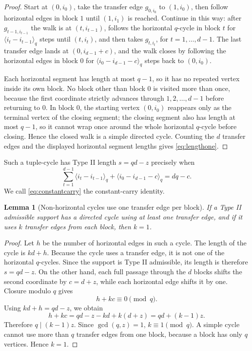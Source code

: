 \documentclass[11pt]{article}
\newtheorem{lemma}[theorem]{Lemma}
\theoremstyle{definition}
\theoremstyle{remark}
\begin{document}
\begin{proof}
Start at $(0,i_0)$, take the transfer edge $g_{0,i_0}$ to $(1,i_0)$, then follow horizontal edges in block $1$ until $(1,i_1)$ is reached.  Continue in this way: after $g_{t-1,i_{t-1}}$ the walk is at $(t,i_{t-1})$, follows the horizontal $q$-cycle in block $t$ for $\langle i_t-i_{t-1}\rangle_q$ steps until $(t,i_t)$, and then takes $g_{t,i_t}$, for $t=1,\ldots,d-1$.  The last transfer edge lands at $(0,i_{d-1}+c)$, and the walk closes by following the horizontal edges in block $0$ for $\langle i_0-i_{d-1}-c\rangle_q$ steps back to $(0,i_0)$.

Each horizontal segment has length at most $q-1$, so it has no repeated vertex inside its own block.  No block other than block $0$ is visited more than once, because the first coordinate strictly advances through $1,2,\ldots,d-1$ before returning to $0$.  In block $0$, the starting vertex $(0,i_0)$ reappears only as the terminal vertex of the closing segment; the closing segment also has length at most $q-1$, so it cannot wrap once around the whole horizontal $q$-cycle before closing.  Hence the closed walk is a simple directed cycle.  Counting the $d$ transfer edges and the displayed horizontal segment lengths gives \eqref{eq:lengthone}.
\end{proof}

Such a tuple-cycle has Type II length $s=qd-z$ precisely when
\begin{equation}
        \sum_{t=1}^{d-1}\langle i_t-i_{t-1}\rangle_q
          +\langle i_0-i_{d-1}-c\rangle_q
        =dq-c .
        \label{eq:constantcarry}
\end{equation}
We call \eqref{eq:constantcarry} the constant-carry identity.

\begin{lemma}[Non-horizontal cycles use one transfer edge per block]
\label{lem:kone}
If a Type II admissible support has a directed cycle using at least one transfer edge, and if it uses $k$ transfer edges from each block, then $k=1$.
\end{lemma}

\begin{proof}
Let $h$ be the number of horizontal edges in such a cycle.  The length of the cycle is $kd+h$.  Because the cycle uses a transfer edge, it is not one of the horizontal $q$-cycles.  Since the support is Type II admissible, its length is therefore $s=qd-z$.  On the other hand, each full passage through the $d$ blocks shifts the second coordinate by $c=d+z$, while each horizontal edge shifts it by one.  Closure modulo $q$ gives
\[
        h+kc\equiv0\pmod q .
\]
Using $kd+h=qd-z$, we obtain
\[
        h+kc=qd-z-kd+k(d+z)=qd+(k-1)z .
\]
Therefore $q\mid (k-1)z$.  Since $\gcd(q,z)=1$, $k\equiv1\pmod q$.  A simple cycle cannot use more than $q$ transfer edges from one block, because a block has only $q$ vertices.  Hence $k=1$.
\end{proof}
\end{document}
